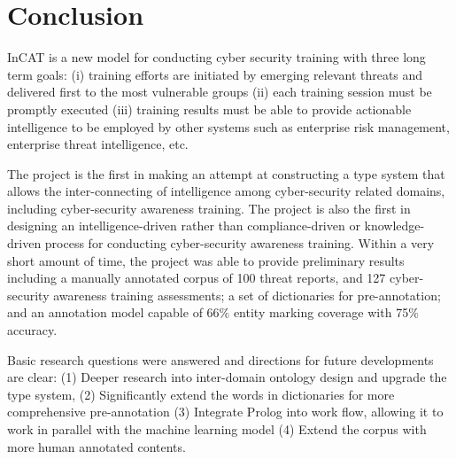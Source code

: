 \documentclass{article} %
\begin{document}
\section{Conclusion}
InCAT is a new model for conducting cyber security training with three long term goals: (i) training efforts are initiated by emerging relevant threats and delivered first to the most vulnerable groups (ii) each training session must be promptly executed (iii) training results must be able to provide actionable intelligence to be employed by other systems such as enterprise risk management, enterprise threat intelligence, etc.

The project is the first in making an attempt at constructing a type system that allows the inter-connecting of intelligence among cyber-security related domains, including cyber-security awareness training. The project is also the first in designing an intelligence-driven rather than compliance-driven or knowledge-driven process for conducting cyber-security awareness training. Within a very short amount of time, the project was able to provide preliminary results including a manually annotated corpus of 100 threat reports, and 127 cyber-security awareness training assessments; a set of dictionaries for pre-annotation; and an annotation model capable of 66\% entity marking coverage with 75\% accuracy.

Basic research questions were answered and directions for future developments are clear: (1) Deeper research into inter-domain ontology design and upgrade the type system, (2) Significantly extend the words in dictionaries for more comprehensive pre-annotation (3) Integrate Prolog into work flow, allowing it to work in parallel with the machine learning model (4) Extend the corpus with more human annotated contents.



\end{document}

